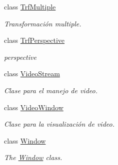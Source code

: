 \begin{DoxyCompactItemize}
class \hyperlink{class_i3_d_1_1_trf_multiple}{Trf\+Multiple}
\begin{DoxyCompactList}\small\item\em Transformación multiple. \end{DoxyCompactList}\item 
class \hyperlink{class_i3_d_1_1_trf_perspective}{Trf\+Perspective}
\begin{DoxyCompactList}\small\item\em perspective \end{DoxyCompactList}\item 
class \hyperlink{class_i3_d_1_1_video_stream}{Video\+Stream}
\begin{DoxyCompactList}\small\item\em Clase para el manejo de video. \end{DoxyCompactList}\item 
class \hyperlink{class_i3_d_1_1_video_window}{Video\+Window}
\begin{DoxyCompactList}\small\item\em Clase para la visualización de video. \end{DoxyCompactList}\item 
class \hyperlink{class_i3_d_1_1_window}{Window}
\begin{DoxyCompactList}\small\item\em The \hyperlink{class_i3_d_1_1_window}{Window} class. \end{DoxyCompactList}\end{DoxyCompactItemize}

